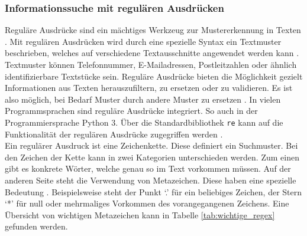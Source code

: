 \subsubsection{Informationssuche mit regulären Ausdrücken}\label{kap:info_re}
Reguläre Ausdrücke sind ein mächtiges Werkzeug zur Mustererkennung in Texten \cite{Kaminski2016}.
Mit regulären Ausdrücken wird durch eine spezielle Syntax ein Textmuster beschrieben, welches auf verschiedene Textausschnitte angewendet werden kann \cite{Ernesti2023-iy}.
Textmuster können Telefonnummer, E-Mailadressen, Postleitzahlen oder ähnlich identifizierbare Textstücke sein.
Reguläre Ausdrücke bieten die Möglichkeit gezielt Informationen aus Texten herauszufiltern, zu ersetzen oder zu validieren.
Es ist also möglich, bei Bedarf Muster durch andere Muster zu ersetzen \cite{Dorn2020-lb}.
In vielen Programmsprachen sind reguläre Ausdrücke integriert.
So auch in der Programmiersprache Python 3.
Über die Standardbibliothek \verb*|re| kann auf die Funktionalität der regulären Ausdrücke zugegriffen werden \cite{inet:python_re}.  \\

Ein regulärer Ausdruck ist eine Zeichenkette.
Diese definiert ein Suchmuster.
Bei den Zeichen der Kette kann in zwei Kategorien unterschieden werden.
Zum einen gibt es konkrete Wörter, welche genau so im Text vorkommen müssen.
Auf der anderen Seite steht die Verwendung von Metazeichen.
Diese haben eine spezielle Bedeutung \cite{Kaminski2016}.
Beispielsweise steht der Punkt \enquote*{.} für ein beliebiges Zeichen, der Stern \enquote*{*} für null oder mehrmaliges Vorkommen des vorangegangenen Zeichens.
Eine Übersicht von wichtigen Metazeichen kann in Tabelle \ref{tab:wichtige_regex} gefunden werden. \\

